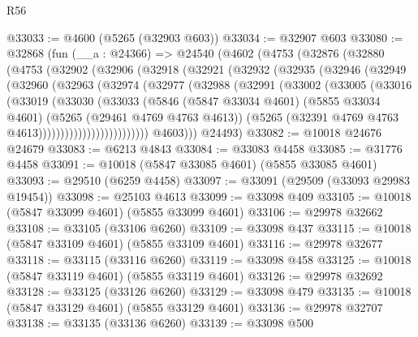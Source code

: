 \begin{lexlean}{R56}
\begin{coremodule}
@33033 := @4600 (@5265 (@32903 @603))
@33034 := @32907 @603
@33080 := @32868
    (fun (__a : @24366) =>
    @24540
      (@4602
        (@4753
          (@32876
            (@32880
              (@4753
                (@32902
                  (@32906
                    (@32918
                      (@32921
                        (@32932
                          (@32935
                            (@32946
                              (@32949
                                (@32960
                                  (@32963
                                    (@32974
                                      (@32977
                                        (@32988
                                          (@32991
                                            (@33002
                                              (@33005
                                                (@33016
                                                  (@33019
                                                    (@33030
                                                      (@33033
                                                        (@5846
                                                          (@5847 @33034 @4601)
                                                          (@5855 @33034 @4601)
                                                          (@5265 (@29461 @4769 @4763 @4613))
                                                          (@5265
                                                            (@32391
                                                              @4769
                                                              @4763
                                                              @4613)))))))))))))))))))))))))
            @4603)))
      @24493)
@33082 := @10018 @24676 @24679
@33083 := @6213 @4843
@33084 := @33083 @4458
@33085 := @31776 @4458
@33091 := @10018 (@5847 @33085 @4601) (@5855 @33085 @4601)
@33093 := @29510 (@6259 @4458)
@33097 := @33091 (@29509 (@33093 @29983 @19454))
@33098 := @25103 @4613
@33099 := @33098 @409
@33105 := @10018 (@5847 @33099 @4601) (@5855 @33099 @4601)
@33106 := @29978 @32662
@33108 := @33105 (@33106 @6260)
@33109 := @33098 @437
@33115 := @10018 (@5847 @33109 @4601) (@5855 @33109 @4601)
@33116 := @29978 @32677
@33118 := @33115 (@33116 @6260)
@33119 := @33098 @458
@33125 := @10018 (@5847 @33119 @4601) (@5855 @33119 @4601)
@33126 := @29978 @32692
@33128 := @33125 (@33126 @6260)
@33129 := @33098 @479
@33135 := @10018 (@5847 @33129 @4601) (@5855 @33129 @4601)
@33136 := @29978 @32707
@33138 := @33135 (@33136 @6260)
@33139 := @33098 @500

\end{coremodule}
\end{lexlean}
